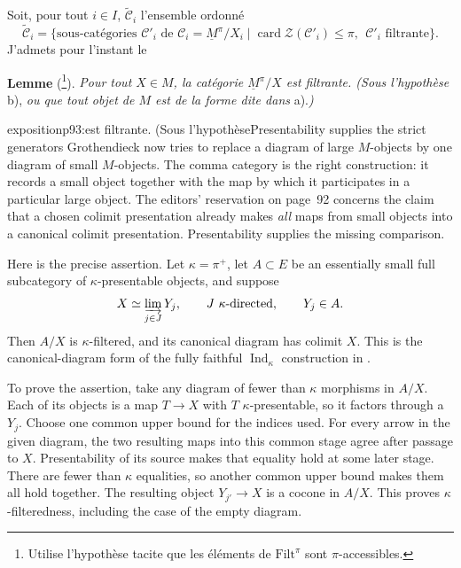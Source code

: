
Soit, pour tout $i\in I$, $\tilde{\mathcal{C}}_i$ l'ensemble ordonné
\[ \tilde{\mathcal{C}}_i = \{\text{sous-catégories } \mathcal{C}'_i \text{ de } \mathcal{C}_i = \underline{M}^\pi/X_i \mid \operatorname{card}\mathcal{Z}(\mathcal{C}'_i)\le\pi,\ \ \mathcal{C}'_i \text{ filtrante}\}. \]
J'admets pour l'instant le

\textbf{Lemme} (\footnote[44]{Utilise l'hypothèse tacite que les éléments de $\mathrm{Filt}^\pi$ sont $\pi$-accessibles.}). \textit{Pour tout $X\in M$, la catégorie $\underline{M}^\pi/X$ est filtrante. (Sous l'hypothèse} b), \textit{ou que tout objet de $M$ est de la forme dite dans} a).\textit{)}

\begin{dcomment}{exposition}{p93:est filtrante. (Sous l'hypothèse}{Presentability supplies the strict generators}
Grothendieck now tries to replace a diagram of large $M$-objects by one diagram of small $M$-objects. The comma category is the right construction: it records a small object together with the map by which it participates in a particular large object. The editors' reservation on page~92 concerns the claim that a chosen colimit presentation already makes \emph{all} maps from small objects into a canonical colimit presentation. Presentability supplies the missing comparison.

Here is the precise assertion. Let $\kappa=\pi^+$, let $A\subset E$ be an essentially small full subcategory of $\kappa$-presentable objects, and suppose
\[
 X\simeq\varinjlim_{j\in J}Y_j,
 \qquad J\ \kappa\text{-directed},\qquad Y_j\in A.
\]
Then $A/X$ is $\kappa$-filtered, and its canonical diagram has colimit $X$. This is the canonical-diagram form of the fully faithful $\operatorname{Ind}_\kappa$ construction in \citet[I, 9.18(a)]{SGA4I1972}.

To prove the assertion, take any diagram of fewer than $\kappa$ morphisms in $A/X$. Each of its objects is a map $T\to X$ with $T$ $\kappa$-presentable, so it factors through a $Y_j$. Choose one common upper bound for the indices used. For every arrow in the given diagram, the two resulting maps into this common stage agree after passage to $X$. Presentability of its source makes that equality hold at some later stage. There are fewer than $\kappa$ equalities, so another common upper bound makes them all hold together. The resulting object $Y_{j'}\to X$ is a cocone in $A/X$. This proves $\kappa$-filteredness, including the case of the empty diagram.


\end{dcomment}
